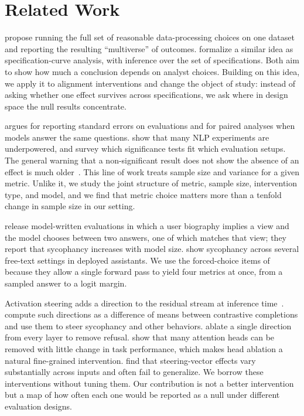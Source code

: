 \section{Related Work}
\label{sec:related}

\citet{steegen2016increasing} propose running the full set of reasonable data-processing choices on one dataset and reporting the resulting ``multiverse'' of outcomes.
\citet{simonsohn2020specification} formalize a similar idea as specification-curve analysis, with inference over the set of specifications.
Both aim to show how much a conclusion depends on analyst choices.
Building on this idea, we apply it to alignment interventions and change the object of study: instead of asking whether one effect survives across specifications, we ask where in design space the null results concentrate.

\citet{miller2024adding} argues for reporting standard errors on evaluations and for paired analyses when models answer the same questions.
\citet{card2020little} show that many NLP experiments are underpowered, and \citet{dror2018hitchhiker} survey which significance tests fit which evaluation setups.
The general warning that a non-significant result does not show the absence of an effect is much older~\cite{altman1995absence}.
This line of work treats sample size and variance for a given metric.
Unlike it, we study the joint structure of metric, sample size, intervention type, and model, and we find that metric choice matters more than a tenfold change in sample size in our setting.

\citet{perez2022discovering} release model-written evaluations in which a user biography implies a view and the model chooses between two answers, one of which matches that view; they report that sycophancy increases with model size.
\citet{sharma2023towards} show sycophancy across several free-text settings in deployed assistants.
We use the forced-choice items of \citet{perez2022discovering} because they allow a single forward pass to yield four metrics at once, from a sampled answer to a logit margin.

Activation steering adds a direction to the residual stream at inference time~\cite{turner2023activation}.
\citet{rimsky2023steering} compute such directions as a difference of means between contrastive completions and use them to steer sycophancy and other behaviors.
\citet{arditi2024refusal} ablate a single direction from every layer to remove refusal.
\citet{michel2019sixteen} show that many attention heads can be removed with little change in task performance, which makes head ablation a natural fine-grained intervention.
\citet{tan2024analyzing} find that steering-vector effects vary substantially across inputs and often fail to generalize.
We borrow these interventions without tuning them.
Our contribution is not a better intervention but a map of how often each one would be reported as a null under different evaluation designs.
